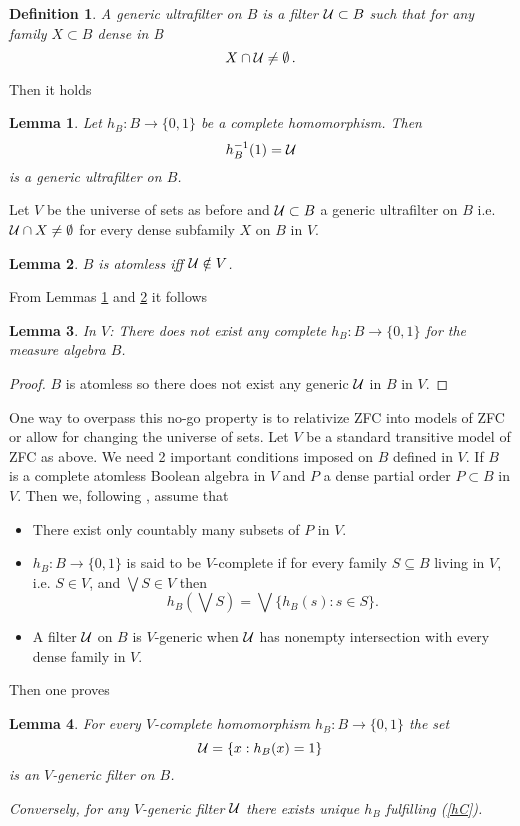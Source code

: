\documentclass[12pt]{article}
\newtheorem{Definition}{Definition}
\newtheorem{Lemma}{Lemma}
\begin{document}
\begin{Definition}
A generic ultrafilter on $B$ is a filter ${\cal U}\subset B$ such that for any family $X\subset B$ dense in B
\[X\cap {\cal U}\neq \emptyset \,.  \]
\end{Definition}
Then it holds 
\begin{Lemma}\cite[p.35]{Solovay1970}\label{hB}
Let $h_B:B\to \{0,1\}$ be a complete homomorphism. Then 
\[h_B^{-1}(1)= {\cal U} \] is a generic ultrafilter on $B$.
\end{Lemma}
Let $V$ be the universe of sets as before and ${\cal U}\subset B$ a generic ultrafilter on $B$ i.e. ${\cal U}\cap X\neq \emptyset$ for every dense subfamily $X$ on $B$ in $V$.
\begin{Lemma}\cite[p.7]{Jech1986}\label{UB} $B$ is atomless iff ${\cal U} \notin V$.
\end{Lemma}
From Lemmas \ref{hB} and \ref{UB} it follows
\begin{Lemma}
In $V$: There does not exist any complete $h_B:B\to \{0,1\}$ for the measure algebra $B$.
\end{Lemma}
\begin{proof}$B$ is atomless so there does not exist any generic ${\cal U}$ in $B$ in $V$.\end{proof}
One way to overpass this no-go property is to relativize ZFC into models of ZFC or allow for changing the universe of sets. Let $V$ be a standard transitive model of ZFC as above. We need 2 important conditions imposed on $B$ defined in $V$. If $B$ is a complete atomless Boolean algebra in $V$ and $P$ a dense partial order $P\subset B$ in $V$. Then we, following \cite{Solovay1970}, assume that
\begin{itemize}
    \item[1.] There exist only countably many subsets of $P$ in $V$.
    \item[2.] $h_B:B\to \{0,1\}$ is said to be $V$-complete if for every family $S\subseteq B$ living in $V$, i.e. $S\in V$, and $\bigvee S\in V$ then 
    \[ h_B(\bigvee S)=\bigvee\{h_B(s):s\in S \} .\]
    \item[3.] A filter ${\cal U}$ on $B$ is $V$-generic when ${\cal U}$ has nonempty intersection with every dense family in $V$.  
\end{itemize}
Then one proves
\begin{Lemma}\cite[p.35]{Solovay1970}
For every $V$-complete homomorphism $h_B:B\to \{0,1\}$ the set 
\begin{equation}\label{hC} {\cal U}=\{x:h_B(x)=1\} \end{equation} is an $V$-generic filter on $B$.

Conversely, for any $V$-generic filter ${\cal U}$ there exists unique $h_B$ fulfilling (\ref{hC}).
\end{Lemma}
\end{document}
